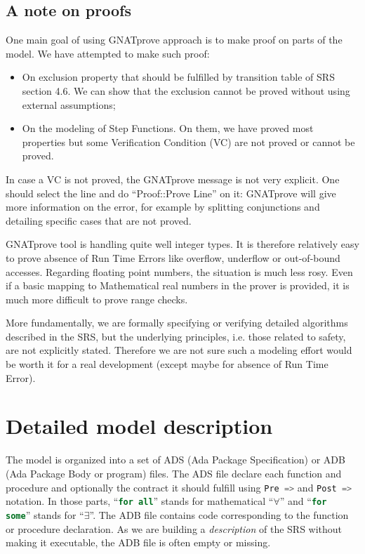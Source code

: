 \documentclass{template/openetcs_report}
\newcommand{\Ada}[1]{\lstinline[language=Ada,basicstyle={\sffamily},framesep=0pt]{#1}}
\begin{document}
\section{A note on proofs}

One main goal of using GNATprove approach is to make proof on parts of
the model. We have attempted to make such proof:
\begin{itemize}
\item On exclusion property that should be fulfilled by transition
  table of SRS section 4.6. We can show that the exclusion cannot be
  proved without using external assumptions;
\item On the modeling of Step Functions. On them, we have proved most
  properties but some Verification Condition (VC) are not proved or
  cannot be proved.
\end{itemize}

In case a VC is not proved, the GNATprove message is not very
explicit. One should select the line and do ``Proof::Prove Line'' on
it: GNATprove will give more information on the error, for example by
splitting conjunctions and detailing specific cases that are not
proved.

GNATprove tool is handling quite well integer types. It is therefore
relatively easy to prove absence of Run Time Errors like overflow,
underflow or out-of-bound accesses. Regarding floating point numbers,
the situation is much less rosy. Even if a basic mapping to
Mathematical real numbers in the prover is provided, it is much more
difficult to prove range checks.

More fundamentally, we are formally specifying or verifying detailed
algorithms described in the SRS, but the underlying principles,
i.e. those related to safety, are not explicitly stated. Therefore we
are not sure such a modeling effort would be worth it for a real
development (except maybe for absence of Run Time Error).

\chapter{Detailed model description}

The model is organized into a set of ADS (Ada Package Specification)
or ADB (Ada Package Body or program) files. The ADS file declare each
function and procedure and optionally the contract it should fulfill
using \Ada{Pre =>} and \Ada{Post =>} notation. In those parts,
``\Ada{for all}'' stands for mathematical ``$\forall$'' and ``\Ada{for
  some}'' stands for ``$\exists$''. The ADB file contains code
corresponding to the function or procedure declaration. As we are
building a \emph{description} of the SRS without making it executable,
the ADB file is often empty or missing.
\end{document}
